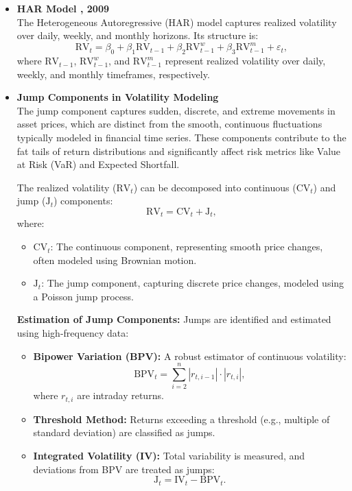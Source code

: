 
\begin{itemize}
    \item \textbf{HAR Model \cite{corsi2009}, 2009} \\
    The Heterogeneous Autoregressive (HAR) model captures realized volatility over daily, weekly, and monthly horizons. Its structure is:
    \begin{equation}\label{har-formula}
        \text{RV}_t = \beta_0 + \beta_1 \text{RV}_{t-1} + \beta_2 \text{RV}^{w}_{t-1} + \beta_3 \text{RV}^{m}_{t-1} + \varepsilon_t,
    \end{equation}
    where \(\text{RV}_{t-1}\), \(\text{RV}^{w}_{t-1}\), and \(\text{RV}^{m}_{t-1}\) represent realized volatility over daily, weekly, and monthly timeframes, respectively.

    \item \textbf{Jump Components in Volatility Modeling} \\
    The jump component captures sudden, discrete, and extreme movements in asset prices, which are distinct from the smooth, continuous fluctuations typically modeled in financial time series. These components contribute to the fat tails of return distributions and significantly affect risk metrics like Value at Risk (VaR) and Expected Shortfall.

    The realized volatility (\(\text{RV}_t\)) can be decomposed into continuous (\(\text{CV}_t\)) and jump (\(\text{J}_t\)) components:
    \[
    \text{RV}_t = \text{CV}_t + \text{J}_t,
    \]
    where:
    \begin{itemize}
        \item \(\text{CV}_t\): The continuous component, representing smooth price changes, often modeled using Brownian motion.
        \item \(\text{J}_t\): The jump component, capturing discrete price changes, modeled using a Poisson jump process.
    \end{itemize}

    \textbf{Estimation of Jump Components:}
    Jumps are identified and estimated using high-frequency data:
    \begin{itemize}
        \item \textbf{Bipower Variation (BPV):} A robust estimator of continuous volatility:
        \[
        \text{BPV}_t = \sum_{i=2}^n |r_{t,i-1}| \cdot |r_{t,i}|,
        \]
        where \(r_{t,i}\) are intraday returns.
        \item \textbf{Threshold Method:} Returns exceeding a threshold (e.g., multiple of standard deviation) are classified as jumps.
        \item \textbf{Integrated Volatility (IV):} Total variability is measured, and deviations from BPV are treated as jumps:
        \[
        \text{J}_t = \text{IV}_t - \text{BPV}_t.
        \]
    \end{itemize}


\end{itemize}
